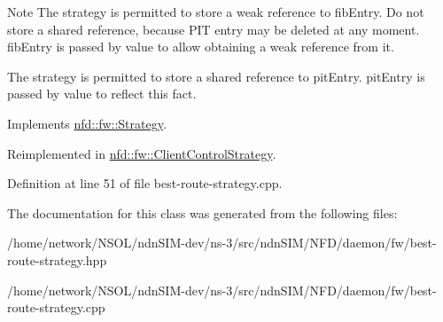 \begin{DoxyNote}{Note}
The strategy is permitted to store a weak reference to fib\+Entry. Do not store a shared reference, because P\+IT entry may be deleted at any moment. fib\+Entry is passed by value to allow obtaining a weak reference from it. 

The strategy is permitted to store a shared reference to pit\+Entry. pit\+Entry is passed by value to reflect this fact. 
\end{DoxyNote}


Implements \hyperlink{classnfd_1_1fw_1_1Strategy_a1193c1881f92b1618a1004f92669eaaa}{nfd\+::fw\+::\+Strategy}.



Reimplemented in \hyperlink{classnfd_1_1fw_1_1ClientControlStrategy_ad1ed942efc1fb9d8578448888365f894}{nfd\+::fw\+::\+Client\+Control\+Strategy}.



Definition at line 51 of file best-\/route-\/strategy.\+cpp.



The documentation for this class was generated from the following files\+:\begin{DoxyCompactItemize}
\item 
/home/network/\+N\+S\+O\+L/ndn\+S\+I\+M-\/dev/ns-\/3/src/ndn\+S\+I\+M/\+N\+F\+D/daemon/fw/best-\/route-\/strategy.\+hpp\item 
/home/network/\+N\+S\+O\+L/ndn\+S\+I\+M-\/dev/ns-\/3/src/ndn\+S\+I\+M/\+N\+F\+D/daemon/fw/best-\/route-\/strategy.\+cpp\end{DoxyCompactItemize}
